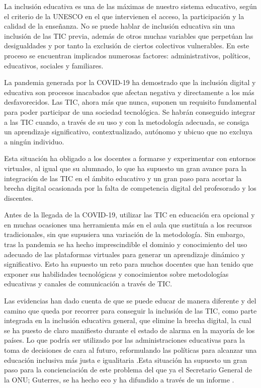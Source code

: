 \documentclass{textolivre}
\begin{document}
La inclusión educativa es una de las máximas de nuestro sistema educativo, según el criterio de la UNESCO en el que intervienen el acceso, la participación y la calidad de la enseñanza. No se puede hablar de inclusión educativa sin una inclusión de las TIC previa, además de otros muchas variables que perpetúan las desigualdades y por tanto la exclusión de ciertos colectivos vulnerables. En este proceso se encuentran implicados numerosas factores: administrativos, políticos, educativos, sociales y familiares.

La pandemia generada por la COVID-19 ha demostrado que la inclusión digital y educativa son procesos inacabados que afectan negativa y directamente a los más desfavorecidos. Las TIC, ahora más que nunca, suponen un requisito fundamental para poder participar de una sociedad tecnológica. Se habrán conseguido integrar a las TIC cuando, a través de su uso y con la metodología adecuada, se consiga un aprendizaje significativo, contextualizado, autónomo y ubicuo que no excluya a ningún individuo.

Esta situación ha obligado a los docentes a formarse y experimentar con entornos virtuales, al igual que su alumnado, lo que ha supuesto un gran avance para la integración de las TIC en el ámbito educativo y un gran paso para acortar la brecha digital ocasionada por la falta de competencia digital del profesorado y los discentes.

Antes de la llegada de la COVID-19, utilizar las TIC en educación era opcional y en muchas ocasiones una herramienta más en el aula que sustituía a los recursos tradicionales, sin que supusiera una variación de la metodología. Sin embargo, tras la pandemia se ha hecho imprescindible el dominio y conocimiento del uso adecuado de las plataformas virtuales para generar un aprendizaje dinámico y significativo. Esto ha supuesto un reto para muchos docentes que han tenido que exponer sus habilidades tecnológicas y conocimientos sobre metodologías educativas y canales de comunicación a través de TIC.

Las evidencias han dado cuenta de que se puede educar de manera diferente y del camino que queda por recorrer para conseguir la inclusión de las TIC, como parte integrada en la inclusión educativa general, que elimine la brecha digital, la cual se ha puesto de claro manifiesto durante el estado de alarma en la mayoría de los países. Lo que podría ser utilizado por las administraciones educativas para la toma de decisiones de cara al futuro, reformulando las políticas para alcanzar una educación inclusiva más justa e igualitaria \cite{alvarez-gardyn2020}.Esta situación ha supuesto un gran paso para la concienciación de este problema del que ya el Secretario General de la ONU; Guterres, se ha hecho eco y ha difundido a través de un informe \cite{onu2020}.
\end{document}
